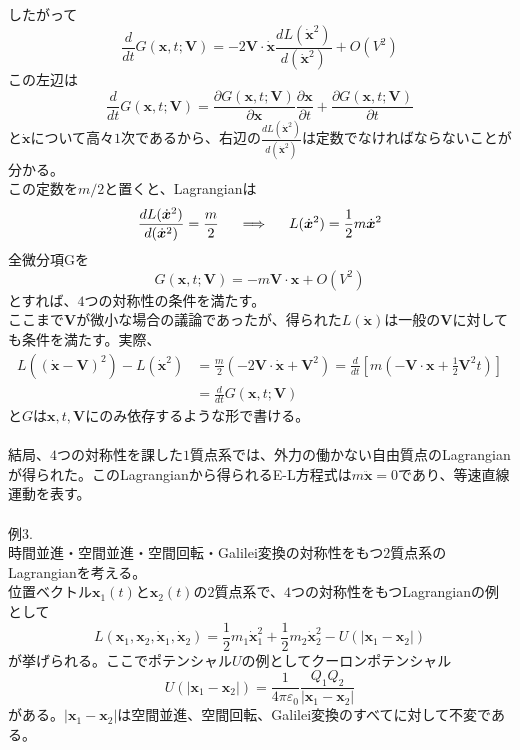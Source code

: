 \documentclass{jsarticle}
\begin{document}
したがって
\[\frac{d}{dt}G(\bm{x},t;\bm{V})=-2\bm{V}\cdot\dot{\bm{x}}\frac{dL(\dot{\bm{x}}^{2})}{d(\dot{\bm{x}}^{2})}+O\left(V^{2}\right)\]
この左辺は
\[\frac{d}{dt}G(\bm{x},t;\bm{V})=\frac{\partial G(\bm{x},t;\bm{V})}{\partial\bm{x}}\frac{\partial\bm{x}}{\partial t}+\frac{\partial G(\bm{x},t;\bm{V})}{\partial t}\]
と\(\dot{\bm{x}}\)について高々\(1\)次であるから、右辺の\(\displaystyle\frac{dL(\dot{\bm{x}}^{2})}{d(\dot{\bm{x}}^{2})}\)は定数でなければならないことが分かる。\\
この定数を\(m/2\)と置くと、Lagrangianは
\[\frac{dL(\dot{\bm{x}}^{2})}{d(\dot{\bm{x}}^{2})}=\frac{m}{2}\hspace{5mm}\Longrightarrow\hspace{5mm}L(\dot{\bm{x}}^{2})=\frac{1}{2}m\dot{\bm{x}}^{2}\]
全微分項Gを
\[G(\bm{x},t;\bm{V})=-m\bm{V}\cdot\bm{x}+O\left(V^{2}\right)\]
とすれば、\(4\)つの対称性の条件を満たす。\\
ここまで\(\bm{V}\)が微小な場合の議論であったが、得られた\(L(\dot{\bm{x}})\)は一般の\(\bm{V}\)に対しても条件を満たす。実際、
\begin{align*}
L((\dot{\bm{x}}-\bm{V})^{2})-L(\dot{\bm{x}}^{2})&=\frac{m}{2}(-2\bm{V}\cdot\dot{\bm{x}}+\bm{V}^{2})=\frac{d}{dt}\left[m\left(-\bm{V}\cdot\bm{x}+\frac{1}{2}\bm{V}^{2}t\right)\right]\\
&=\frac{d}{dt}G(\bm{x},t;\bm{V})
\end{align*}
と\(G\)は\(\bm{x},t,\bm{V}\)にのみ依存するような形で書ける。\\
\\
結局、\(4\)つの対称性を課した\(1\)質点系では、外力の働かない自由質点のLagrangianが得られた。このLagrangianから得られるE-L方程式は\(m\ddot{\bm{x}}=0\)であり、等速直線運動を表す。\\
\\
例3.\\
時間並進・空間並進・空間回転・Galilei変換の対称性をもつ\(2\)質点系のLagrangianを考える。\\
位置ベクトル\(\bm{x}_{1}(t)\)と\(\bm{x}_{2}(t)\)の\(2\)質点系で、\(4\)つの対称性をもつLagrangianの例として
\[L(\bm{x}_{1},\bm{x}_{2},\dot{\bm{x}}_{1},\dot{\bm{x}}_{2})=\frac{1}{2}m_{1}\dot{\bm{x}}_{1}^{2}+\frac{1}{2}m_{2}\dot{\bm{x}}_{2}^{2}-U(|\bm{x}_{1}-\bm{x}_{2}|)\]
が挙げられる。ここでポテンシャル\(U\)の例としてクーロンポテンシャル
\[U(|\bm{x}_{1}-\bm{x}_{2}|)=\frac{1}{4\pi\varepsilon_{0}}\frac{Q_{1}Q_{2}}{|\bm{x}_{1}-\bm{x}_{2}|}\]
がある。\(|\bm{x}_{1}-\bm{x}_{2}|\)は空間並進、空間回転、Galilei変換のすべてに対して不変である。\\
\end{document}

